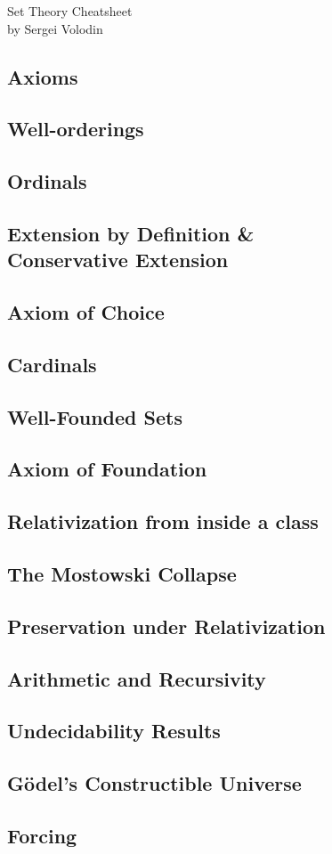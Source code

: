 \documentclass[twocolumn]{article}
\begin{document}
\begin{center}
	{\large Set Theory Cheatsheet}\\
	by Sergei Volodin
\end{center}
\subsection*{Axioms}
\subsection*{Well-orderings}
\subsection*{Ordinals}
\subsection*{Extension by Definition \&\\ Conservative Extension}
\subsection*{Axiom of Choice}
\subsection*{Cardinals}
\subsection*{Well-Founded Sets}
\subsection*{Axiom of Foundation}
\subsection*{Relativization from inside a class}
\subsection*{The Mostowski Collapse}
\subsection*{Preservation under Relativization}
\subsection*{Arithmetic and Recursivity}
\subsection*{Undecidability Results}
\subsection*{G\"odel's Constructible Universe}
\subsection*{Forcing}
\end{document}
